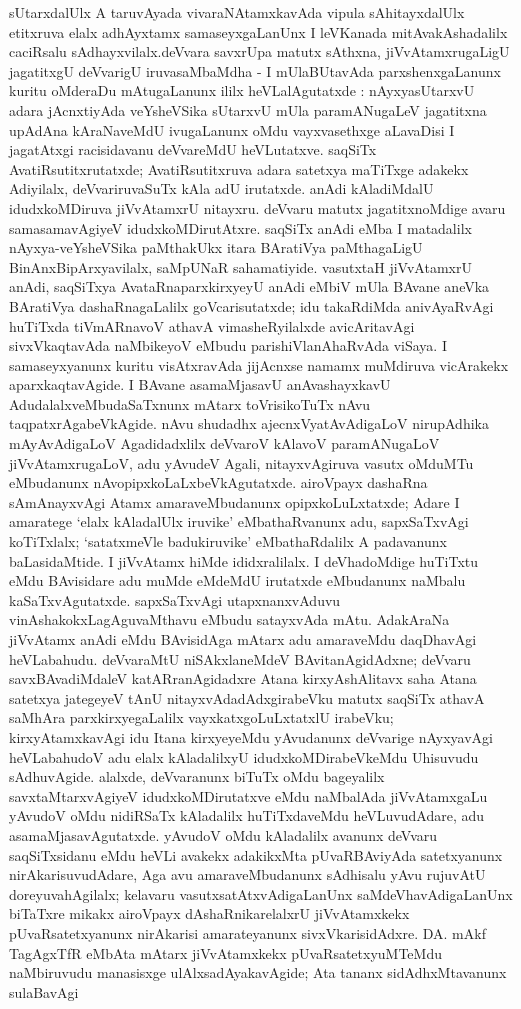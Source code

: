sUtarxdalUlx A taruvAyada vivaraNAtamxkavAda vipula sAhitayxdalUlx etitx\-ruva elalx adhAyxtamx samaseyxgaLanUnx I leVKanada mitAvakAshadalilx caciRsalu sAdhayxvilalx.\break deVvara savxrUpa matutx sAthxna, jiVvAtamxrugaLigU jagatitxgU deVvarigU iruva\break saMbaMdha - I mUlaBUtavAda parxshenxgaLanunx kuritu oMderaDu mAtugaLanunx ililx heVLalAgutatxde : nAyxyasUtarxvU adara jAcnxtiyAda veYsheVSika sUtarxvU mUla para\-mANugaLeV jagatitxna upAdAna kAraNaveMdU ivugaLanunx oMdu vayxvasethxge aLavaDisi I jagatAtxgi racisidavanu deVvareMdU heVLutatxve. saqSiTx AvatiR\-su\-titxrutatxde; AvatiRsu\-titxruva adara satetxya maTiTxge adakekx Adiyilalx, deVvariruvaSuTx kAla adU iru\-tatxde. anAdi kAladiMdalU idudxkoMDiruva jiVvAtamxrU nitayxru. deVvaru matutx jagatitx\-noMdige avaru samasamavAgiyeV idudxkoMDirutAtxre. saqSiTx anAdi eMba I matadalilx nAyxya-veYsheVSika paMthakUkx itara BAratiVya paMthagaLigU BinAnxBipArxya\-vilalx, saMpUNaR sahamatiyide. vasutxtaH jiVvAtamxrU anAdi, saqSiTxya AvataRna\break parxkirxyeyU anAdi eMbiV mUla BAvane aneVka BAratiVya dashaRnagaLalilx goVcari\-sutatxde; idu takaRdiMda anivAyaRvAgi huTiTxda tiVmARnavoV athavA vimasheR\-yilalxde avicAritavAgi sivxVkaqtavAda naMbikeyoV eMbudu parishiVlanAhaRvAda viSaya. I samaseyxyanunx kuritu visAtxravAda jijAcnxse namamx muMdiruva vicArakekx aparxkaqtavAgide. I BAvane asamaMjasavU anAvashayxkavU AdudalalxveMbudaSaTxnunx mAtarx toVrisikoTuTx nAvu taqpatxrAgabeVkAgide. nAvu shudadhx ajecnxVyatAvAdigaLoV nirupAdhika mAyAvAdigaLoV  Agadidadxlilx deVvaroV kAlavoV paramANugaLoV jiVvAtamxrugaLoV, adu yAvudeV Agali, nitayxvAgiruva vasutx oMduMTu eMbudanunx nAvopipxkoLaLxbeVkAgutatxde. airoVpayx dashaRna sAmAnayxvAgi Atamx amaraveMbudanunx opipxkoLuLxtatxde; Adare I amaratege `elalx kAladalUlx iruvike' eMbathaRvanunx adu, sapxSaTxvAgi koTiTxlalx; `satatxmeVle badukiruvike' eMbathaRdalilx A padavanunx baLasidaMtide. I jiVvAtamx hiMde ididxralilalx. I deVhadoMdige huTiTxtu eMdu BAvisidare adu muMde eMdeMdU irutatxde eMbudanunx naMbalu kaSaTxvAgutatxde. sapxSaTxvAgi utapxnanxvAduvu vinAshakokxLagAguvaMthavu eMbudu satayxvAda mAtu. AdakAraNa jiVvAtamx anAdi eMdu BAvisidAga mAtarx adu amaraveMdu daqDhavAgi heVLabahudu. deVvaraMtU niSAkxlaneMdeV BAvitanAgidAdxne; deVvaru savxBAvadiMdaleV katARranAgidadxre Atana kirxyAshAlitavx saha Atana satetxya jategeyeV tAnU nitayxvAdadAdxgirabeVku matutx saqSiTx athavA saMhAra parxkirxyegaLalilx vayxkatxgoLuLxtatxlU irabeVku; kirxyAtamxkavAgi idu Itana kirxyeyeMdu yAvudanunx deVvarige nAyxyavAgi heVLabahudoV adu elalx kAladalilxyU idudxkoMDirabeVkeMdu Uhisuvudu sAdhuvAgide. alalxde, deVvaranunx biTuTx oMdu bageyalilx savxtaMtarxvAgiyeV idudxkoMDirutatxve eMdu naMbalAda jiVvAtamxgaLu yAvudoV oMdu nidiRSaTx kAladalilx huTiTxdaveMdu heVLuvudAdare, adu asamaMjasavAgutatxde. yAvudoV oMdu kAladalilx avanunx deVvaru saqSiTxsidanu eMdu heVLi avakekx adakikxMta pUvaRBAviyAda satetxyanunx nirAkarisuvudAdare, Aga avu amaraveMbudanunx sAdhisalu yAvu rujuvAtU doreyuvahAgilalx; kelavaru vasutxsatAtxvAdigaLanUnx saMdeVhavAdigaLanUnx biTaTxre mikakx airoVpayx dAshaRnikarelalxrU jiVvAtamxkekx pUvaRsatetxyanunx nirAkarisi amarateyanunx sivxVkarisidAdxre. DA. mAkf TagAgxTfR eMbAta mAtarx jiVvAtamxkekx pUvaRsatetxyuMTeMdu naMbiruvudu manasisxge ulAlxsadAyakavAgide; Ata tananx sidAdhxMtavanunx sulaBavAgi 